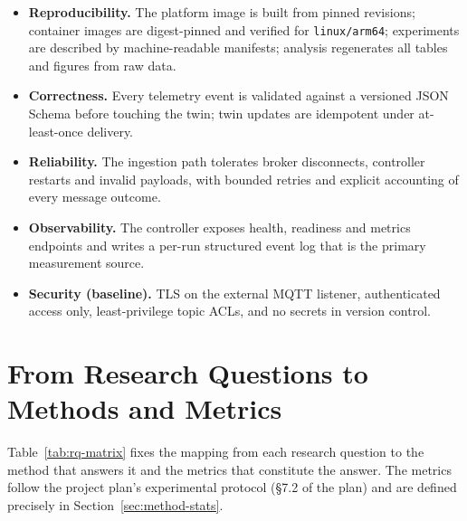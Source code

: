 \begin{itemize}
  \item \textbf{Reproducibility.} The platform image is built from pinned
        revisions; container images are digest-pinned and verified for
        \texttt{linux/arm64}; experiments are described by machine-readable
        manifests; analysis regenerates all tables and figures from raw data.
  \item \textbf{Correctness.} Every telemetry event is validated against a
        versioned \ac{JSON} Schema before touching the twin; twin updates are
        idempotent under at-least-once delivery.
  \item \textbf{Reliability.} The ingestion path tolerates broker disconnects,
        controller restarts and invalid payloads, with bounded retries and
        explicit accounting of every message outcome.
  \item \textbf{Observability.} The controller exposes health, readiness and
        metrics endpoints and writes a per-run structured event log that is
        the primary measurement source.
  \item \textbf{Security (baseline).} \ac{TLS} on the external \ac{MQTT}
        listener, authenticated access only, least-privilege topic \ac{ACL}s,
        and no secrets in version control.
\end{itemize}

\section{From Research Questions to Methods and Metrics}
\label{sec:method-matrix}

\noindent Table~\ref{tab:rq-matrix} fixes the mapping from each research
question to the method that answers it and the metrics that constitute the
answer. The metrics follow the project plan's experimental protocol (\S7.2 of
the plan) and are defined precisely in Section~\ref{sec:method-stats}.

